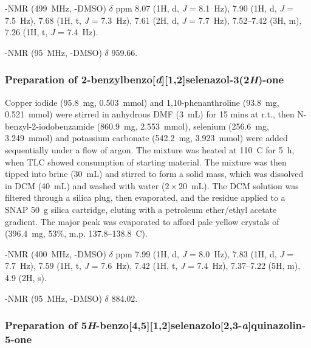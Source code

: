 \begin{refsection}
    -NMR (499~MHz, -DMSO) $ \delta $ ppm 8.07 (1H, d, \textit{J} = 8.1~Hz), 7.90 (1H, d, \textit{J} = 7.5~Hz), 7.68 (1H, t, \textit{J} = 7.3~Hz), 7.61 (2H, d, \textit{J} = 7.7~Hz), 7.52--7.42 (3H, m), 7.26 (1H, t, \textit{J} = 7.4~Hz).
    
    -NMR (95~MHz, -DMSO) $ \delta $ 959.66.
    
    \subsubsection[Preparation of \refcmpd{ebs.bn}]{Preparation of 2-benzylbenzo[\textit{d}][1,2]selenazol-3(2\textit{H})-one }
    
    Copper iodide (95.8~mg, 0.503~mmol) and 1,10-phenanthroline (93.8~mg, 0.521~mmol) were stirred in anhydrous DMF (3~mL) for 15 mins at r.t., then N-benzyl-2-iodobenz\-amide (860.9~mg, 2.553~mmol), selenium (256.6~mg, 3.249~mmol) and potassium carbonate (542.2~mg, 3.923~mmol) were added sequentially under a flow of argon.
    The mixture was heated at 110~\degree{}C for 5~h, when TLC showed consumption of starting material.
    The mixture was then tipped into brine (30~mL) and stirred to form a solid mass, which was dissolved in DCM (40~mL) and washed with water ($ 2 \times 20 $~mL).
    The DCM solution was filtered through a silica plug, then evaporated, and the residue applied to a SNAP 50~g silica cartridge, eluting with a petroleum ether/ethyl acetate gradient.
    The major peak was evaporated to afford pale yellow crystals of  (396.4~mg, 53\%, m.p. 137.8--138.8~\degree{}C).\autocite{Bhabak2010}
    
    -NMR (400~MHz, -DMSO) $\delta$ ppm 7.99 (1H, d, \textit{J} = 8.0~Hz), 7.83 (1H, d, \textit{J} = 7.7~Hz), 7.59 (1H, t, \textit{J} = 7.6~Hz), 7.42 (1H, t, \textit{J} = 7.4~Hz), 7.37--7.22 (5H, m), 4.9 (2H, s).
    
    -NMR (95~MHz, -DMSO) $ \delta $ 884.02.
    
    \subsubsection[Preparation of \refcmpd{tetracycle}]{Preparation of 5\textit{H}-benzo[4,5][1,2]selenazolo[2,3-\textit{a}]quinazolin-5-one }
    

\end{refsection}
